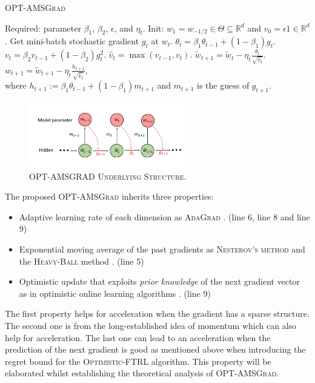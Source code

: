\documentclass[11pt]{article}
\theoremstyle{k}
\begin{document}
\vspace{-0.15in}
\begin{minipage}{0.54\linewidth}
\begin{algorithm}[H]
\begin{algorithmic}[1] 
\small
\caption{\textsc{OPT-AMSGrad}} \label{alg:optamsgrad}
\STATE Required: parameter $\beta_1$, $\beta_2$, $\epsilon$, and $\eta_t$. 
\STATE Init: $w_1 = w_{-1/2} \in \Theta \subseteq \mathbb R^d $ and $v_{0} = \epsilon 1 \in \mathbb R^{d}$.
\STATE Get mini-batch stochastic gradient $g_t$ at $w_t$.
\STATE $\theta_t = \beta_{1} \theta_{t-1} + (1 - \beta_{1}) g_t$.
\STATE $v_t = \beta_2 v_{t-1} + (1 - \beta_2) g_t^{2}$.
\STATE $\hat{v}_t = \max( \hat{v}_{t-1} , v_t )$. 
\STATE $\tilde{w}_{t+1} =  \tilde{w}_{t} - \eta_t \frac{\theta_t}{ \sqrt{\hat{v}_t }  } $.
\STATE $w_{t+1} = \tilde{w}_{t+1} - \eta_{t} \frac{h_{t+1}}{ \sqrt{\hat{v}_t } } $,  \\  
where $h_{t+1}:= \beta_{1} \theta_{t-1} + (1 - \beta_{1}) m_{t+1}$  and $m_{t+1}$ is the guess of $g_{t+1}$. 
\ENDFOR 
\end{algorithmic}
\end{algorithm}
\end{minipage}
\hfill
\begin{minipage}{0.46\linewidth}
\begin{figure}[H]
\captionsetup{justification=centering}
    \hspace{-0.15in}
    \includegraphics[width=2.7in]{plot.pdf}
    \caption{\textsc{OPT-AMSGRAD Underlying Structure}.}
     \label{fig:scheme}
\end{figure}
\end{minipage}

The proposed \textsc{OPT-AMSGrad} inherits three properties:
\begin{itemize}
\item Adaptive learning rate of each dimension as \textsc{AdaGrad} \citep{DHS11}. (line 6, line 8 and line 9)
\item Exponential moving average of the past gradients as \textsc{Nesterov's method} \citep{N04} and the \textsc{Heavy-Ball} method \citep{P64}. (line 5)
\item Optimistic update that exploits \emph{prior knowledge} of the next gradient vector as in optimistic online learning algorithms \citep{CJ12,rakhlin2013online,SALS15}. (line 9)
\end{itemize}
The first property helps for acceleration when the gradient has a sparse structure.
The second one is from the long-established idea of momentum which can also help for acceleration. 
The last one can lead to an acceleration when the prediction of the next gradient is good as mentioned above when introducing the regret bound for the \textsc{Optimistic-FTRL} algorithm.
This property will be elaborated whilst establishing the theoretical analysis of \textsc{OPT-AMSGrad}.
\end{document}
